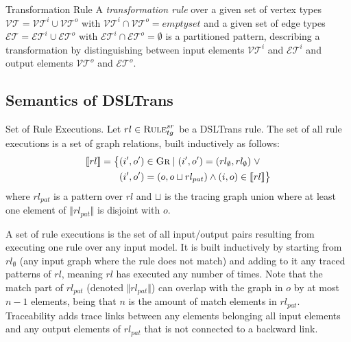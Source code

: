 \begin{definition}{Transformation Rule}
A \emph{transformation rule} over a given set of vertex types $\mathcal{VT} = \mathcal{VT}^i \cup \mathcal{VT}^o$ with $ \mathcal{VT}^i \cap \mathcal{VT}^o = emptyset$ and a given set of edge types $\mathcal{ET} =  \mathcal{ET}^i \cup \mathcal{ET}^o$ with $\mathcal{ET}^i \cap \mathcal{ET}^o = \emptyset$ is a partitioned pattern, describing a transformation by distinguishing between input elements $ \mathcal{VT}^i$ and  $\mathcal{ET}^i$ and output elements $ \mathcal{VT}^o$ and  $\mathcal{ET}^o$. 
\end{definition}


\subsection{Semantics of DSLTrans}

\begin{definition}{Set of Rule Executions.}
\label{def:rule_exec_set}
Let $rl\in \textsc{Rule}^{sr}_{tg}$ be a DSLTrans rule. The set of all rule
executions is a set of graph relations, built inductively as follows:
\begin{align*}
\llbracket rl\rrbracket =\big\{&(i',o')\in \textsc{Gr}\;\lvert\;(i',o') =
(rl_{\emptyset},rl_{\emptyset})\;\lor \\&(i',o') = (o,o\sqcup rl_{pat})\land
(i,o)\in \llbracket rl\rrbracket \big\}
\end{align*} 
where  $rl_{pat}$ is a pattern over $rl$ and $\sqcup$
is the tracing graph union where at least one element of $\Vert rl_{pat}\Vert$
is disjoint with $o$.
\end{definition}

A set of rule executions is the set of all input/output pairs resulting from
executing one rule over any input model. It is built inductively by starting
from $rl_{\emptyset}$ (any input graph where the rule does not match) and adding
to it any traced patterns of $rl$, meaning $rl$ has executed any number of
times. Note that the match part of $rl_{pat}$ (denoted $\Vert rl_{pat}\Vert$)
can overlap with the graph in $o$ by at most $n-1$ elements, being that $n$ is the amount
of match elements in $rl_{pat}$. Traceability adds trace links between any
elements belonging all input elements and any output elements of $rl_{pat}$ that
is not connected to a backward link.


